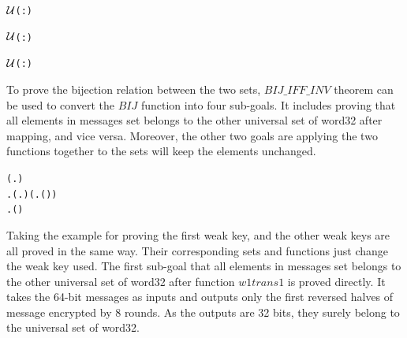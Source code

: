 \documentclass{article}
\begin{document}
\begin{alltt}
   \HOLTokenTurnstile{}    \ensuremath{{\cal{U}}}(:)
\end{alltt}

\begin{alltt}
   \HOLTokenTurnstile{}    \ensuremath{{\cal{U}}}(:)
\end{alltt}

\begin{alltt}
   \HOLTokenTurnstile{}    \ensuremath{{\cal{U}}}(:)
\end{alltt}

To prove the bijection relation between the two sets, $BIJ\_IFF\_INV$ theorem can be used to convert the $BIJ$ function into
four sub-goals. It includes proving that all elements in messages set belongs to the other universal set of word32 after mapping,
and vice versa. Moreover, the other two goals are applying the two functions together to the sets will keep the elements unchanged.

\begin{alltt}
   \HOLTokenTurnstile{}     \HOLSymConst{\HOLTokenEquiv{}}
   (\HOLSymConst{\HOLTokenForall{}}.  \HOLSymConst{\HOLTokenIn{}}  \HOLSymConst{\HOLTokenImp{}}   \HOLSymConst{\HOLTokenIn{}} ) \HOLSymConst{\HOLTokenConj{}}
   \HOLSymConst{\HOLTokenExists{}}. (\HOLSymConst{\HOLTokenForall{}}.  \HOLSymConst{\HOLTokenIn{}}  \HOLSymConst{\HOLTokenImp{}}   \HOLSymConst{\HOLTokenIn{}} ) \HOLSymConst{\HOLTokenConj{}} (\HOLSymConst{\HOLTokenForall{}}.  \HOLSymConst{\HOLTokenIn{}}  \HOLSymConst{\HOLTokenImp{}}  ( ) \HOLSymConst{=} ) \HOLSymConst{\HOLTokenConj{}}
       \HOLSymConst{\HOLTokenForall{}}.  \HOLSymConst{\HOLTokenIn{}}  \HOLSymConst{\HOLTokenImp{}}  ( ) \HOLSymConst{=} 
\end{alltt}

Taking the example for proving the first weak key, and the other weak keys are all proved in the same way. Their corresponding
sets and functions just change the weak key used.
The first sub-goal that all elements in messages set belongs to the other universal set of word32 after function $w1trans1$ is
proved directly. It takes the 64-bit messages as inputs and outputs only the first reversed halves of message encrypted by 8
rounds. As the outputs are 32 bits, they surely belong to the universal set of word32.
\end{document}
